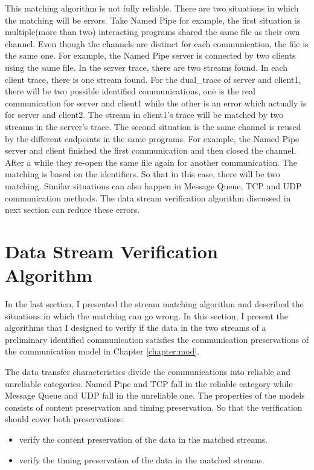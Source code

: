 This matching algorithm is not fully reliable. There are two situations in which the matching will be errors. Take Named Pipe for example, the first situation is multiple(more than two) interacting programs shared the same file as their own channel. Even though the channels are distinct for each communication, the file is the same one. For example, the Named Pipe server is connected by two clients using the same file. In the server trace, there are two streams found. In each client trace, there is one stream found. For the dual\_trace of server and client1, there will be two possible identified communications, one is the real communication for server and client1 while the other is an error which actually is for server and client2. The stream in client1's trace will be matched by two streams in the server's trace. The second situation is the same channel is reused by the different endpoints in the same programs. For example, the Named Pipe server and client finished the first communication and then closed the channel. After a while they re-open the same file again for another communication. The matching is based on the identifiers. So that in this case, there will be two matching. Similar situations can also happen in Message Queue, TCP and UDP communication methods. The data stream verification algorithm discussed in next section can reduce these errors. 

\section{Data Stream Verification Algorithm}\label{verfication}
In the last section, I presented the stream matching algorithm and described the situations in which the matching can go wrong. In this section, I present the algorithms that I designed to verify if the data in the two streams of a preliminary identified communication satisfies the communication preservations of the communication model in Chapter \ref{chapter:mod}. 

The data transfer characteristics divide the communications into reliable and unreliable categories. Named Pipe and TCP fall in the reliable category while Message Queue and UDP fall in the unreliable one. The properties of the models consists of content preservation and timing preservation. So that the verification should cover both preservations: 
\begin{itemize}
\item verify the content preservation of the data in the matched streams. 
\item verify the timing preservation of the data in the matched streams. 
\end{itemize}

